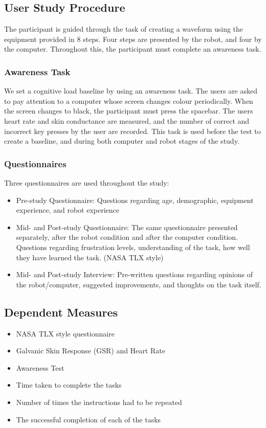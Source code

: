 \documentclass[conference]{IEEEtran}
\begin{document}
\subsection{User Study Procedure}
The participant is guided through the task of creating a waveform using the equipment provided in 8 steps. Four steps are presented by the robot, and four by the computer. Throughout this, the participant must complete an awareness task.

\subsubsection{Awareness Task}
We set a cognitive load baseline by using an awareness task. The users are asked to pay attention to a computer whose screen changes colour periodically. When the screen changes to black, the participant must press the spacebar. The users heart rate and skin conductance are measured, and the number of correct and incorrect key presses by the user are recorded.
This task is used before the test to create a baseline, and during both computer and robot stages of the study.

\subsubsection{Questionnaires}
Three questionnaires are used throughout the study:
\begin{itemize}
    \item Pre-study Questionnaire: Questions regarding age, demographic, equipment experience, and robot experience
    \item Mid- and Post-study Questionnaire: The same questionnaire presented separately, after the robot condition and after the computer condition. Questions regarding frustration levels, understanding of the task, how well they have learned the task. (NASA TLX style)
    \item Mid- and Post-study Interview: Pre-written questions regarding opinions of the robot/computer, suggested improvements, and thoughts on the task itself.
\end{itemize}

\subsection{Dependent Measures}
\begin{itemize}
    \item NASA TLX style questionnaire \cite{hart1988development}
    \item Galvanic Skin Response (GSR) and Heart Rate
    \item Awareness Test
    \item Time taken to complete the tasks
    \item Number of times the instructions had to be repeated
    \item The successful completion of each of the tasks
\end{itemize}
\end{document}
